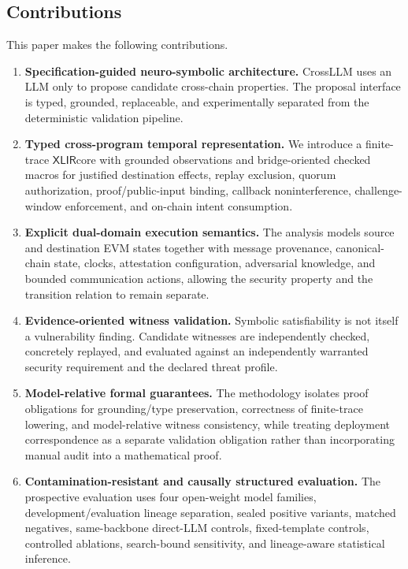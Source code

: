 \documentclass[journal]{IEEEtran}
\theoremstyle{definition}
\newcommand{\xlir}{\ensuremath{\mathsf{XLIR}}}
\begin{document}
\subsection{Contributions}
This paper makes the following contributions.
\begin{enumerate}
  \item \textbf{Specification-guided neuro-symbolic architecture.} CrossLLM uses an LLM only to propose candidate cross-chain properties. The proposal interface is typed, grounded, replaceable, and experimentally separated from the deterministic validation pipeline.
  \item \textbf{Typed cross-program temporal representation.} We introduce a finite-trace \xlir core with grounded observations and bridge-oriented checked macros for justified destination effects, replay exclusion, quorum authorization, proof/public-input binding, callback noninterference, challenge-window enforcement, and on-chain intent consumption.
  \item \textbf{Explicit dual-domain execution semantics.} The analysis models source and destination EVM states together with message provenance, canonical-chain state, clocks, attestation configuration, adversarial knowledge, and bounded communication actions, allowing the security property and the transition relation to remain separate.
  \item \textbf{Evidence-oriented witness validation.} Symbolic satisfiability is not itself a vulnerability finding. Candidate witnesses are independently checked, concretely replayed, and evaluated against an independently warranted security requirement and the declared threat profile.
  \item \textbf{Model-relative formal guarantees.} The methodology isolates proof obligations for grounding/type preservation, correctness of finite-trace lowering, and model-relative witness consistency, while treating deployment correspondence as a separate validation obligation rather than incorporating manual audit into a mathematical proof.
  \item \textbf{Contamination-resistant and causally structured evaluation.} The prospective evaluation uses four open-weight model families, development/evaluation lineage separation, sealed positive variants, matched negatives, same-backbone direct-LLM controls, fixed-template controls, controlled ablations, search-bound sensitivity, and lineage-aware statistical inference.
\end{enumerate}
\end{document}
